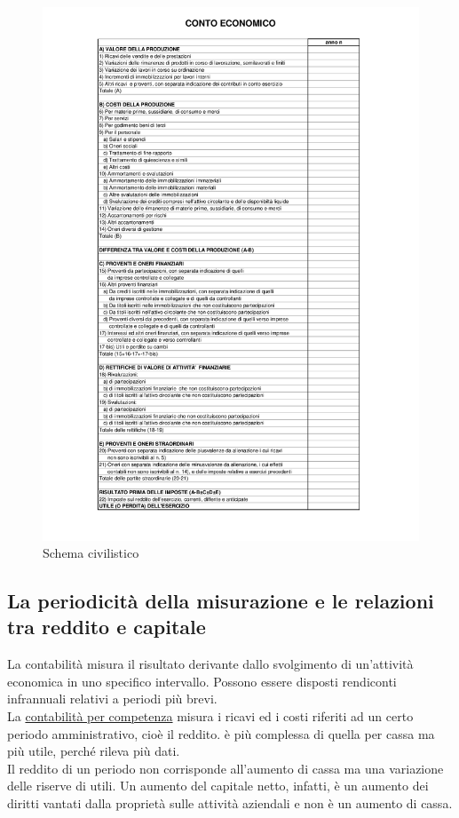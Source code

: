 \documentclass{report}
\begin{document}
	\begin{figure}[H]
		\centering
		\caption{Schema civilistico}
		\label{fig:conto-economico}
		\includegraphics[width=1\linewidth]{conto-economico}
	\end{figure}
	\newpage
	\subsection{La periodicità della misurazione e le relazioni tra reddito e capitale}
	La contabilità misura il risultato derivante dallo svolgimento di un'attività economica in uno specifico intervallo. Possono essere disposti rendiconti infrannuali relativi a periodi più brevi.
	\medskip \\
	La \underline{contabilità per competenza} misura i ricavi ed i costi riferiti ad un certo periodo amministrativo, cioè il reddito. è più complessa di quella per cassa ma più utile, perché rileva più dati.
	\medskip \\
	Il reddito di un periodo non corrisponde all'aumento di cassa ma una variazione delle riserve di utili. Un aumento del capitale netto, infatti, è un aumento dei diritti vantati dalla proprietà sulle attività aziendali e non è un aumento di cassa.
\end{document}
